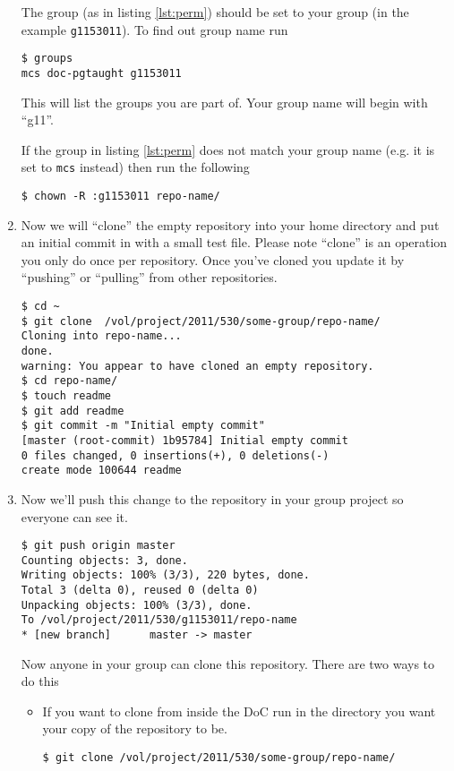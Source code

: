 \documentclass[a4paper,10pt,fleqn]{article}
\begin{document}
\begin{enumerate}
		The group (as in listing \ref{lst:perm}) should be set to your group (in the example \texttt{g1153011}). To find out group name run
		\begin{lstlisting}
$ groups 
mcs doc-pgtaught g1153011
		\end{lstlisting}
		This will list the groups you are part of. Your group name will begin with ``g11''.

		If the group in listing \ref{lst:perm} does not match your group name (e.g. it is set to \texttt{mcs} instead) then run the following
		\begin{lstlisting}
$ chown -R :g1153011 repo-name/
		\end{lstlisting}

		\item Now we will ``clone'' the empty repository into your home directory and put an initial commit in with a small test file. Please note ``clone'' is an operation you only do once per repository. Once you've cloned you update it by ``pushing'' or ``pulling'' from other repositories.
		\begin{lstlisting}
$ cd ~
$ git clone  /vol/project/2011/530/some-group/repo-name/
Cloning into repo-name...
done.
warning: You appear to have cloned an empty repository.
$ cd repo-name/
$ touch readme
$ git add readme
$ git commit -m "Initial empty commit"
[master (root-commit) 1b95784] Initial empty commit
0 files changed, 0 insertions(+), 0 deletions(-)
create mode 100644 readme
		\end{lstlisting}

		\item Now we'll push this change to the repository in your group project so everyone can see it.
		\begin{lstlisting}
$ git push origin master
Counting objects: 3, done.
Writing objects: 100% (3/3), 220 bytes, done.
Total 3 (delta 0), reused 0 (delta 0)
Unpacking objects: 100% (3/3), done.
To /vol/project/2011/530/g1153011/repo-name
* [new branch]      master -> master
		\end{lstlisting}

		Now anyone in your group can clone this repository. There are two ways to do this
		\begin{itemize}
			\item If you want to clone from inside the DoC run in the directory you want your copy of the repository to be.
			\begin{lstlisting}
$ git clone /vol/project/2011/530/some-group/repo-name/
			\end{lstlisting}


\end{itemize}
\end{enumerate}
\end{document}
